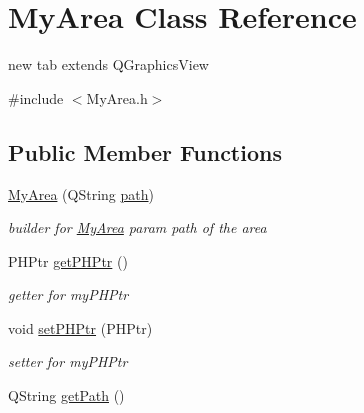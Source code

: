 \hypertarget{class_my_area}{\section{\-My\-Area \-Class \-Reference}
\label{class_my_area}
}


new tab extends \-Q\-Graphics\-View  




{\ttfamily \#include $<$\-My\-Area.\-h$>$}

\subsection*{\-Public \-Member \-Functions}
\begin{DoxyCompactItemize}
\item 
\hypertarget{class_my_area_a31f13e95c83414c538b6c46e55e19c79}{\hyperlink{class_my_area_a31f13e95c83414c538b6c46e55e19c79}{\-My\-Area} (\-Q\-String \hyperlink{class_my_area_a70561a408470de740f580da6717871bf}{path})}\label{class_my_area_a31f13e95c83414c538b6c46e55e19c79}

\begin{DoxyCompactList}\small\item\em builder for \hyperlink{class_my_area}{\-My\-Area} param path of the area \end{DoxyCompactList}\item 
\hypertarget{class_my_area_a7b94b516e730ddcee16d946c76bbc2b3}{\-P\-H\-Ptr \hyperlink{class_my_area_a7b94b516e730ddcee16d946c76bbc2b3}{get\-P\-H\-Ptr} ()}\label{class_my_area_a7b94b516e730ddcee16d946c76bbc2b3}

\begin{DoxyCompactList}\small\item\em getter for my\-P\-H\-Ptr \end{DoxyCompactList}\item 
\hypertarget{class_my_area_a087c389370070a348af025aaee620fc8}{void \hyperlink{class_my_area_a087c389370070a348af025aaee620fc8}{set\-P\-H\-Ptr} (\-P\-H\-Ptr)}\label{class_my_area_a087c389370070a348af025aaee620fc8}

\begin{DoxyCompactList}\small\item\em setter for my\-P\-H\-Ptr \end{DoxyCompactList}\item 
\hypertarget{class_my_area_a84edb9791a8c988cb9f13ac1ef2025d5}{\-Q\-String \hyperlink{class_my_area_a84edb9791a8c988cb9f13ac1ef2025d5}{get\-Path} ()}\label{class_my_area_a84edb9791a8c988cb9f13ac1ef2025d5}


\end{DoxyCompactItemize}
